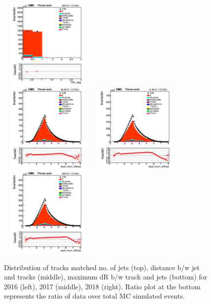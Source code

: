 \documentclass{cernatlasnote}
\begin{document}
\begin{figure}[htp]
 \includegraphics[width=4.6cm, height=4.4cm]{images/emu_channel/2018/18_Range_0pt2_1pt8/track_btag_TRK_Linear.png}\\
\includegraphics[width=4.6cm, height=4.4cm]{images/emu_channel/2016/16_Range_0pt2_1pt8/track_track_Hemi_dRmax_TRK_Linear.png}
\includegraphics[width=4.6cm, height=4.4cm]{images/emu_channel/2017/17_Range_0pt2_1pt8/track_track_Hemi_dRmax_TRK_Linear.png}
 \includegraphics[width=4.6cm, height=4.4cm]{images/emu_channel/2018/18_Range_0pt2_1pt8/track_track_Hemi_dRmax_TRK_Linear.png}\\
  \caption{Distribution of tracks matched no. of jets (top), distance b/w jet and tracks (middle), maximum dR b/w track and jets (bottom) for 2016 (left), 2017 (middle), 2018 (right). Ratio plot at the bottom represents the ratio of data over total MC simulated events.}
 \label{fig:L0DATAMC}
  \end{figure}
\end{document}
